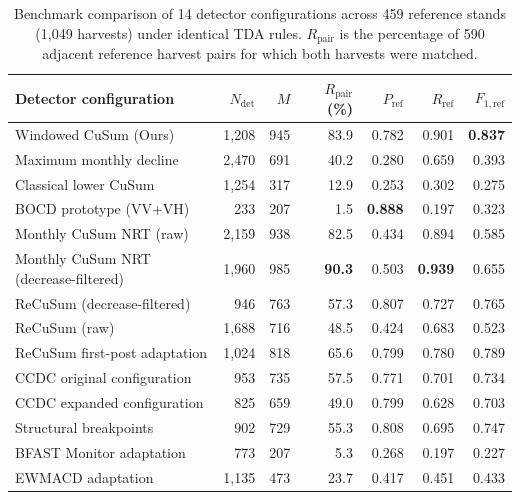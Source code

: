 \begin{table}[pos=!htbp]
    \centering
    \small
    \setlength{\tabcolsep}{4pt}
    \caption{Benchmark comparison of 14 detector configurations across 459 reference stands (1,049 harvests) under identical TDA rules. $R_{\mathrm{pair}}$ is the percentage of 590 adjacent reference harvest pairs for which both harvests were matched.}
    \label{tab:benchmark_comparison}
    \begin{tabular*}{\linewidth}{@{\extracolsep{\fill}}lrrrrrr@{}}
        \toprule
        Detector configuration & $N_{\mathrm{det}}$ & $M$ & $R_{\mathrm{pair}}$ (\%) & $P_{\mathrm{ref}}$ & $R_{\mathrm{ref}}$ & $F_{1,\mathrm{ref}}$ \\
        \midrule
        Windowed CuSum (Ours) & 1,208 & 945 & 83.9 & 0.782 & 0.901 & \textbf{0.837} \\
        Maximum monthly decline & 2,470 & 691 & 40.2 & 0.280 & 0.659 & 0.393 \\
        Classical lower CuSum & 1,254 & 317 & 12.9 & 0.253 & 0.302 & 0.275 \\
        BOCD prototype (VV+VH) & 233 & 207 & 1.5 & \textbf{0.888} & 0.197 & 0.323 \\
        Monthly CuSum NRT (raw) & 2,159 & 938 & 82.5 & 0.434 & 0.894 & 0.585 \\
        Monthly CuSum NRT (decrease-filtered) & 1,960 & 985 & \textbf{90.3} & 0.503 & \textbf{0.939} & 0.655 \\
        ReCuSum (decrease-filtered) & 946 & 763 & 57.3 & 0.807 & 0.727 & 0.765 \\
        ReCuSum (raw) & 1,688 & 716 & 48.5 & 0.424 & 0.683 & 0.523 \\
        ReCuSum first-post adaptation & 1,024 & 818 & 65.6 & 0.799 & 0.780 & 0.789 \\
        CCDC original configuration & 953 & 735 & 57.5 & 0.771 & 0.701 & 0.734 \\
        CCDC expanded configuration & 825 & 659 & 49.0 & 0.799 & 0.628 & 0.703 \\
        Structural breakpoints & 902 & 729 & 55.3 & 0.808 & 0.695 & 0.747 \\
        BFAST Monitor adaptation & 773 & 207 & 5.3 & 0.268 & 0.197 & 0.227 \\
        EWMACD adaptation & 1,135 & 473 & 23.7 & 0.417 & 0.451 & 0.433 \\
        \bottomrule
    \end{tabular*}
\end{table}

